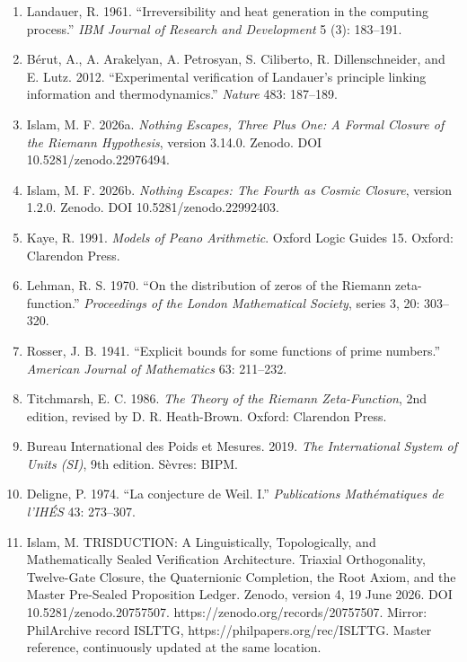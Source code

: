 \documentclass[10pt]{article}
\newenvironment{refsblock}{\par\small}{\par}
\begin{document}
\begin{refsblock}
\begin{enumerate}
{  Certified Programs and Proofs}: 367--381.
\item
  Landauer, R. 1961. ``Irreversibility and heat generation in the
  computing process.'' \emph{IBM Journal of Research and Development} 5
  (3): 183--191.
\item
  Bérut, A., A. Arakelyan, A. Petrosyan, S. Ciliberto, R.
  Dillenschneider, and E. Lutz. 2012. ``Experimental verification of
  Landauer's principle linking information and thermodynamics.''
  \emph{Nature} 483: 187--189.
\item
  Islam, M. F. 2026a. \emph{Nothing Escapes, Three Plus One: A Formal
  Closure of the Riemann Hypothesis}, version 3.14.0. Zenodo. DOI
  10.5281/zenodo.22976494.
\item
  Islam, M. F. 2026b. \emph{Nothing Escapes: The Fourth as Cosmic
  Closure}, version 1.2.0. Zenodo. DOI 10.5281/zenodo.22992403.
\item
  Kaye, R. 1991. \emph{Models of Peano Arithmetic}. Oxford Logic Guides
  15. Oxford: Clarendon Press.
\item
  Lehman, R. S. 1970. ``On the distribution of zeros of the Riemann
  zeta-function.'' \emph{Proceedings of the London Mathematical
  Society}, series 3, 20: 303--320.
\item
  Rosser, J. B. 1941. ``Explicit bounds for some functions of prime
  numbers.'' \emph{American Journal of Mathematics} 63: 211--232.
\item
  Titchmarsh, E. C. 1986. \emph{The Theory of the Riemann
  Zeta-Function}, 2nd edition, revised by D. R. Heath-Brown. Oxford:
  Clarendon Press.
\item
  Bureau International des Poids et Mesures. 2019. \emph{The
  International System of Units (SI)}, 9th edition. Sèvres: BIPM.
\item
  Deligne, P. 1974. ``La conjecture de Weil. I.'' \emph{Publications
  Mathématiques de l'IHÉS} 43: 273--307.
\item
  Islam, M. TRISDUCTION: A Linguistically, Topologically, and
  Mathematically Sealed Verification Architecture. Triaxial
  Orthogonality, Twelve-Gate Closure, the Quaternionic Completion, the
  Root Axiom, and the Master Pre-Sealed Proposition Ledger. Zenodo,
  version 4, 19 June 2026. DOI 10.5281/zenodo.20757507.
  https://zenodo.org/records/20757507. Mirror: PhilArchive record
  ISLTTG, https://philpapers.org/rec/ISLTTG. Master reference,
  continuously updated at the same location.
\end{enumerate}

\end{refsblock}
\end{document}
